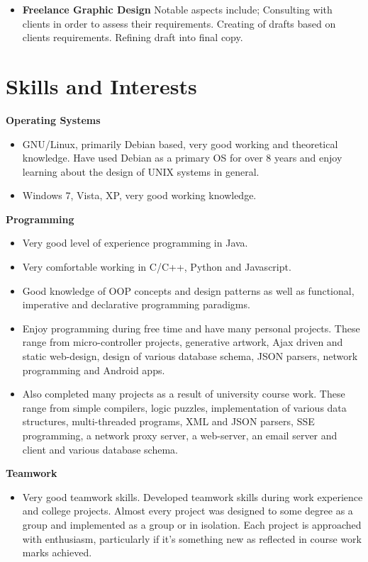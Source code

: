 \documentclass{res}
\begin{document}
\begin{resume}
\begin{itemize}
    \item{{\bf Freelance Graphic Design}} Notable aspects include; Consulting with clients in order to assess their requirements. Creating of drafts based on clients requirements. Refining draft into final copy.
  \end{itemize}
    
 


     
\section{Skills and Interests} 
\renewcommand{\labelitemi}{$\bullet$}
\vspace{0.1in}
 {\bf Operating Systems}
    \begin{itemize} %
      \item GNU/Linux, primarily Debian based, very good working and theoretical knowledge. Have used Debian as a primary OS for over 8 years and enjoy learning about the design of UNIX systems in general.
      \item Windows 7, Vista, XP, very good working knowledge.
      \end{itemize}
{\bf Programming} 
       \begin{itemize}
        \item Very good level of experience programming in Java. 
        \item Very comfortable working in C/C++, Python and Javascript. 
        \item Good knowledge of OOP concepts and design patterns as well as functional, imperative and declarative programming paradigms. 
        \item Enjoy programming during free time and have many personal projects. These range from micro-controller projects, generative artwork, Ajax driven and static web-design, design of various database schema, JSON parsers, network programming and Android apps.
        \item Also completed many projects as a result of university course work. These range from simple compilers, logic puzzles, implementation of various data structures, multi-threaded programs, XML and JSON parsers, SSE programming, a network proxy server, a web-server, an email server and client and various database schema.
    \end{itemize}

    {\bf  Teamwork} 
        \begin{itemize}
        \item  Very good teamwork skills. Developed teamwork skills during work experience and college projects. Almost every project was designed to some degree as a group and implemented as a group or in isolation. Each project is approached with enthusiasm, particularly if it's something new as reflected in course work marks achieved.
       \end{itemize} 


\end{resume}
\end{document}

